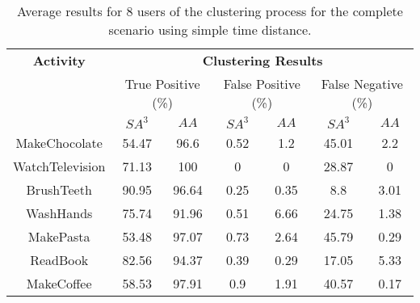 \begin{table}[htbp]\scriptsize
  \begin{center}
        \begin{tabular}{ccccccc}
            \hline            
            \textbf{Activity} & \multicolumn{6}{c}{\textbf{Clustering Results}} \\
             & \multicolumn{2}{c}{True Positive (\%)} & \multicolumn{2}{c}{False Positive (\%)} & \multicolumn{2}{c}{False Negative (\%)} \\
             & $SA^3$ & $AA$ & $SA^3$ & $AA$ & $SA^3$ & $AA$ \\
            \hline
            MakeChocolate   & 54.47 & 96.6  & 0.52 & 1.2  & 45.01 & 2.2 \\
	    WatchTelevision & 71.13 & 100   & 0    & 0    & 28.87 & 0    \\
	    BrushTeeth      & 90.95 & 96.64 & 0.25 & 0.35 & 8.8   & 3.01 \\
	    WashHands       & 75.74 & 91.96 & 0.51 & 6.66 & 24.75 & 1.38 \\
	    MakePasta       & 53.48 & 97.07 & 0.73 & 2.64 & 45.79 & 0.29 \\
	    ReadBook        & 82.56 & 94.37 & 0.39 & 0.29 & 17.05 & 5.33 \\
	    MakeCoffee      & 58.53 & 97.91 & 0.9  & 1.91 & 40.57 & 0.17 \\
            \hline
        \end{tabular}
        \caption{Average results for 8 users of the clustering process for the complete scenario using simple time distance.}
        \label{tab-r-comp-t1}
        \end{center}
\end{table}



